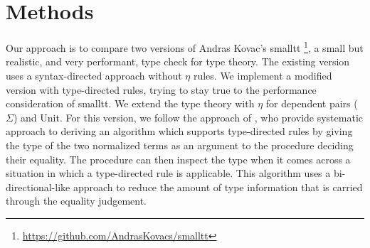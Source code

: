 \section{Methods}
Our approach is to compare two versions of 
Andras Kovac's smalltt \footnote{\url{https://github.com/AndrasKovacs/smalltt}}, a small but realistic, and very performant, type check for type theory.
The existing version uses a syntax-directed approach without $\eta$ rules.
We implement a modified version with type-directed rules, trying to stay true to the performance consideration of smalltt.
We extend the type theory with $\eta$ for dependent pairs ($\Sigma$) and Unit.
For this version, we follow the approach of \citet{Chapman2005}, who provide systematic approach to deriving an algorithm which supports type-directed rules by giving the type of the two normalized terms as an argument to the procedure deciding their equality.
The procedure can then inspect the type when it comes across a situation in which a type-directed rule is applicable.
This algorithm uses a bi-directional-like  approach to reduce the amount of type information that is carried through the equality judgement.

% 

